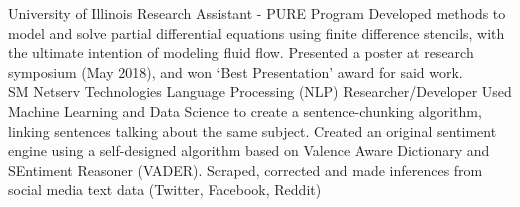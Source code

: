 \documentclass[10pt]{article} %
\begin{document}
\begin{paracol}{2}
{} %
{University of Illinois} %
{Research Assistant - PURE Program} %
{Developed methods to model and solve partial differential equations using finite difference stencils, with the ultimate intention of modeling fluid flow. Presented a poster at research symposium (May 2018), and won ‘Best Presentation’ award for said work.}\\ %

{} %
{SM Netserv Technologies} %
{Language Processing (NLP) Researcher/Developer} %
{Used Machine Learning and Data Science to create a sentence-chunking algorithm, linking sentences talking about the same subject. Created an original sentiment engine using a self-designed algorithm based on Valence Aware Dictionary and SEntiment Reasoner (VADER). Scraped, corrected and made inferences from social media text data (Twitter, Facebook, Reddit)}\\ %



\vspace{-\baselineskip}\medskip %

\switchcolumn %



\end{paracol}
\end{document}
